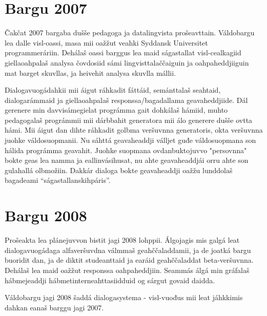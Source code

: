\documentclass[a4paper,norsk]{article}
\begin{document}
\section{Bargu 2007}

Čakčat 2007 bargaba dušše pedagoga ja datalingvista prošeavttain. Váldobargu lea dalle visl-oassi, masa mii oažžut veahki Syddansk Universitet programmeráriin. Dehálaš oassi barggus lea maid ságastallat visl-cealkagiid giellaoahpalaš analysa čovdosiid sámi lingvisttalaččaiguin ja oahpaheddjiiguin mat barget skuvllas, ja heivehit analysa skuvlla mállii.

Dialogavuogádahkii mii áigut ráhkadit fáttáid, semánttalaš seahtaid, dialogarámmaid ja giellaoahpalaš responssa/bagadallama geavaheddjiide. Dál gerenere min davvisámegielat prográmma gait dohkálaš hámiid, muhto pedagogalaš prográmmii mii dárbbahit generatora mii álo generere dušše ovtta hámi. Mii áigut dan dihte ráhkadit golbma veršuvnna generatoris, okta veršuvnna juohke váldosuopmanii. Nu sáhttá geavaheaddji válljet guđe váldosuopmana son hálida prográmma geavahit. Juohke suopmana ovdanbuktojuvvo "persovnna" bokte geas lea namma ja eallinvásihusat, nu ahte geavaheaddjái orru ahte son gulahallá olbmožiin. Dakkár dialoga bokte geavaheaddji oažžu lunddolaš bagadeami ``ságastallanskihpáris''.
 
\section{Bargu 2008}

Prošeakta lea plánejuvvon bistit jagi 2008 lohppii. Álgojagis mis galgá leat dialogavuogádaga alfaveršuvdna válmmaš geahččaladdamii, ja de joatká bargu buoridit dan, ja de diktit studeanttaid ja earáid geahččaladdat beta-veršuvnna. Dehálaš lea maid oažžut responssa oahpaheddjiin. Seammás álgá min gráfalaš hábmejeaddji hábmetinterneahttasiidduid og sárgut govaid daidda. 

Váldobargu jagi 2008 šaddá dialogasystema - visl-vuođus mii leat jáhkkimis dahkan eanaš barggu jagi 2007. 
\end{document}
